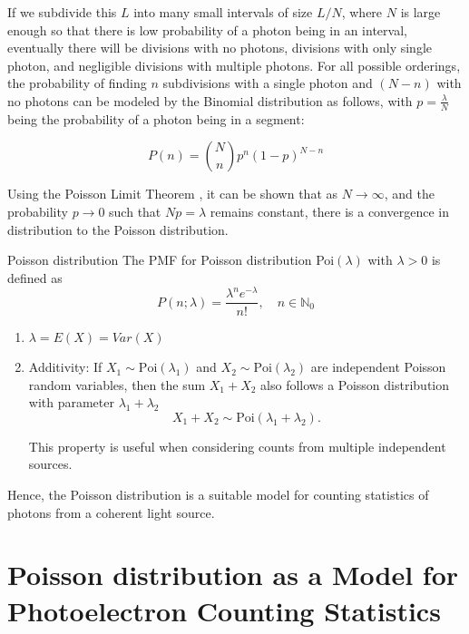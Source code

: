 If we subdivide this $L$ into many small intervals  of size $L/N$, where $N$ is large enough so that there is low probability of a photon being in an interval, eventually there will be divisions with no photons, divisions with only single photon, and negligible divisions with multiple photons. For all possible orderings, the probability of finding $n$ subdivisions with a single photon and $(N-n)$ with no photons can be modeled by the Binomial distribution as follows, with $p=\frac{\lambda}{N}$ being the probability of a photon being in a segment:

\begin{equation}
    P(n) = \binom{N}{n} p^n (1 - p)^{N - n}
\end{equation}

Using the Poisson Limit Theorem \cite{fellerIntroductionProbabilityTheory1968}, it can be shown that as $N \to \infty$, and the probability $p \to 0$ such that $Np = \lambda$ remains constant, there is a convergence in distribution to the Poisson distribution.

\begin{note}
    {Poisson distribution}
    The \gls{PMF} for Poisson distribution Poi\((\lambda)\) with \(\lambda > 0\) is defined as
    \begin{equation}
        P(n;\lambda) = \frac{\lambda^n e^{-\lambda}}{n!}, \quad n \in \mathbb{N}_0
    \end{equation}
    \begin{enumerate}
        \item $\lambda = E(X) = Var(X)$ 
        \item Additivity: If $X_1 \sim \text{Poi}(\lambda_1)$ and $X_2 \sim \text{Poi}(\lambda_2)$ are independent Poisson random variables, then the sum $X_1 + X_2$ also follows a Poisson distribution with parameter $\lambda_1 + \lambda_2$
        \begin{equation}
            X_1 + X_2 \sim \text{Poi}(\lambda_1 + \lambda_2).
        \end{equation}
        
        This property is useful when considering counts from multiple independent sources.
    \end{enumerate}
\end{note}

Hence, the Poisson distribution is a suitable model for counting statistics of photons from a coherent light source.

\section{Poisson distribution as a Model for Photoelectron Counting Statistics}\label{section:photoelectron-counting-stats}

